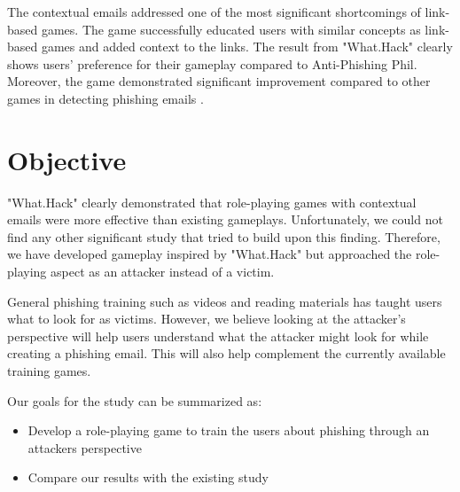 The contextual emails addressed one of the most significant shortcomings of link-based games. The game successfully educated users with similar concepts as link-based games and added context to the links. The result from "What.Hack" clearly shows users' preference for their gameplay compared to Anti-Phishing Phil. Moreover, the game demonstrated significant improvement compared to other games in detecting phishing emails \cite{what_hack}.

\section{Objective}
"What.Hack" clearly demonstrated that role-playing games with contextual emails were more effective than existing gameplays. Unfortunately, we could not find any other significant study that tried to build upon this finding. Therefore, we have developed gameplay inspired by "What.Hack" but approached the role-playing aspect as an attacker instead of a victim.

General phishing training such as videos and reading materials has taught users what to look for as victims. However, we believe looking at the attacker's perspective will help users understand what the attacker might look for while creating a phishing email. This will also help complement the currently available training games.

Our goals for the study can be summarized as:

\begin{itemize}
    \setlength\itemsep{-0.6em}
    \item Develop a role-playing game to train the users about phishing through an attackers perspective
    \item Compare our results with the existing study
\end{itemize}
